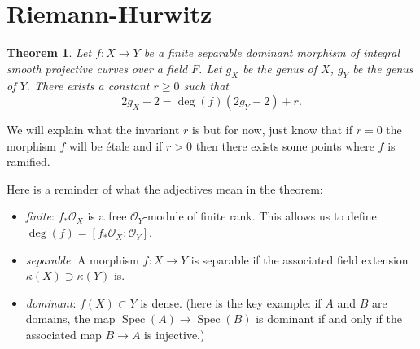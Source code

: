 \documentclass[12pt]{article}
\numberwithin{equation}{section}
\newtheorem{theorem}{Theorem}[subsection]
\theoremstyle{definition}
\theoremstyle{remark}
\newcommand{\Ocal}{\mathcal{O}}
\newcommand{\Spec}{\operatorname{Spec}}
\begin{document}
\section{Riemann-Hurwitz}

\begin{theorem}
	Let $f:X \to Y$ be a finite separable dominant morphism of integral smooth projective curves over a field $F$. 
	Let $g_X$ be the genus of $X$, $g_Y$ be the genus of $Y$.
	There exists a constant $r\geq 0$ such that 
	 $$ 2g_X-2 = \deg(f)( 2g_Y - 2) + r. $$
\end{theorem}
We will explain what the invariant $r$ is but for now, just know that if $r=0$ the morphism $f$ will be \'etale and if $r>0$ then there exists some points where $f$ is ramified. 

Here is a reminder of what the adjectives mean in the theorem:
\begin{itemize}
	\item \emph{finite}: $f_*\Ocal_X$ is a free $\Ocal_Y$-module of finite rank. This allows us to define $\deg(f) = [f_*\Ocal_X:\Ocal_Y]$.
	\item \emph{separable}: A morphism $f:X \to Y$ is separable if the associated field extension $\kappa(X)\supset \kappa(Y)$ is. 
	\item \emph{dominant}: $f(X)\subset Y$ is dense. 
	(here is the key example: if $A$ and $B$ are domains, the map $\Spec(A) \to \Spec(B)$ is dominant if and only if the associated map $B\to A$ is injective.)
\end{itemize}
\end{document}

